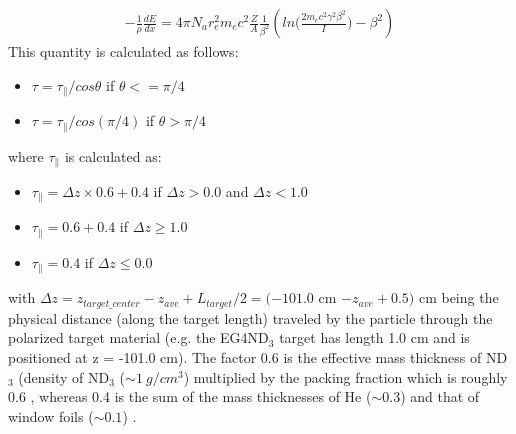 \begin{eqnarray}
\label{eqBetheBlock}
-\frac{1}{\rho} \frac{dE}{dx} = 4\pi N_a r_e^2 m_e c^2 \frac{Z}{A} \frac{1}{\beta^2} \left( ln\bigg( \frac{2m_ec^2\gamma^2\beta^2}{I} \bigg) - \beta^2 \right) 
\end{eqnarray}
This quantity is calculated as follows:
\begin{itemize}
\item $\tau = \tau_{\parallel}/cos\theta$ \quad if $\theta <= \pi/4$
\item $\tau = \tau_{\parallel}/cos(\pi/4)$ \quad if $\theta > \pi/4$    %
\end{itemize}
where $\tau_{\parallel}$ is calculated as:
\begin{itemize}
\item $\tau_{\parallel} = \Delta z \times 0.6 + 0.4$ \quad if $\Delta z > 0.0 $ and $\Delta z < 1.0 $
\item $\tau_{\parallel} = 0.6 + 0.4$ \quad if $\Delta z \geq  1.0$
\item $\tau_{\parallel} = 0.4$ \quad if $\Delta z \leq  0.0$
\end{itemize}
with $\Delta z = z_{target\_center} - z_{ave} + L_{target}/2 = (-101.0$ cm $ - z_{ave} + 0.5)$ cm being the physical distance (along the target length) traveled by the particle through the polarized target material (e.g. the EG4ND$_3$ target has length 1.0 cm and is positioned at z = -101.0 cm). The factor 0.6 is the effective mass thickness of ND$_3$ (density of ND$_3$ ($\sim 1 ~g/cm^3$) %
multiplied by the packing fraction which is roughly 0.6  \cite{rfersch_th}, whereas 0.4 is the sum of the mass thicknesses of He ($\sim 0.3$) and that of window foils ($\sim 0.1$) \cite{nGuler_th}. %


    
